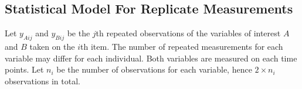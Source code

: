 \documentclass[12pt, a4paper]{report}
\theoremstyle{plain}
\theoremstyle{definition}
\theoremstyle{remark}
\begin{document}


 










\subsection{Statistical Model For Replicate Measurements}
Let $y_{Aij}$ and $y_{Bij}$ be the $j$th repeated observations of the variables of interest $A$ and $B$ taken on the $i$th item. The number of repeated measurements for each variable may differ for each individual.
Both variables are measured on each time points. Let $n_{i}$ be the number of observations for each variable, hence $2\times n_{i}$ observations in total.
\end{document}

